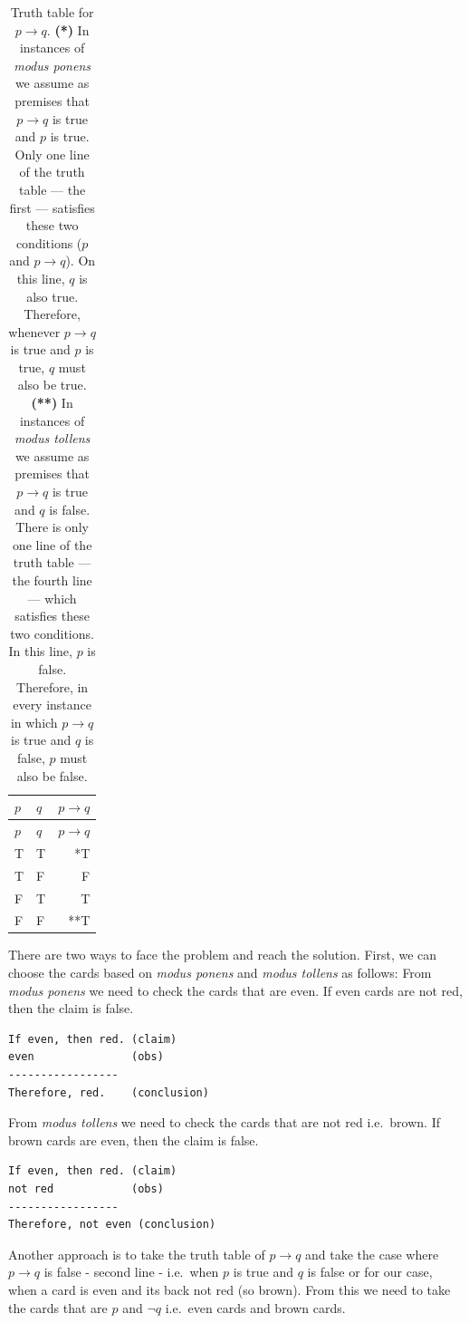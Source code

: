 \documentclass[
]{book}
\begin{document}
\begin{longtable}[]{@{}llr@{}}
\caption{Truth table for \(p \rightarrow q\). \textbf{(*)} In instances of \emph{modus ponens} we assume as premises that \(p \rightarrow q\) is true and \(p\) is true. Only one line of the truth table --- the first --- satisfies these two conditions (\(p\) and \(p \rightarrow q\)). On this line, \(q\) is also true. Therefore, whenever \(p \rightarrow q\) is true and \(p\) is true, \(q\) must also be true. \textbf{(**)} In instances of \emph{modus tollens} we assume as premises that \(p \rightarrow q\) is true and \(q\) is false. There is only one line of the truth table --- the fourth line --- which satisfies these two conditions. In this line, \(p\) is false. Therefore, in every instance in which \(p \rightarrow q\) is true and \(q\) is false, \(p\) must also be false.}\tabularnewline
\toprule
\(p\) & \(q\) & \(p \rightarrow q\) \\
\midrule
\endfirsthead
\toprule
\(p\) & \(q\) & \(p \rightarrow q\) \\
\midrule
\endhead
T & T & *T \\
T & F & F \\
F & T & T \\
F & F & **T \\
\bottomrule
\end{longtable}





There are two ways to face the problem and reach the solution. First, we can choose the cards based on \emph{modus ponens} and \emph{modus tollens} as follows: From \emph{modus ponens} we need to check the cards that are even. If even cards are not red, then the claim is false.

\begin{verbatim}
If even, then red. (claim)
even               (obs)
-----------------
Therefore, red.    (conclusion)
\end{verbatim}

From \emph{modus tollens} we need to check the cards that are not red i.e.~brown. If brown cards are even, then the claim is false.

\begin{verbatim}
If even, then red. (claim)
not red            (obs)
-----------------
Therefore, not even (conclusion)
\end{verbatim}

Another approach is to take the truth table of \(p \rightarrow q\) and take the case where \(p \rightarrow q\) is false - second line - i.e.~when \(p\) is true and \(q\) is false or for our case, when a card is even and its back not red (so brown). From this we need to take the cards that are \(p\) and \(\lnot q\) i.e.~even cards and brown cards.
\end{document}
